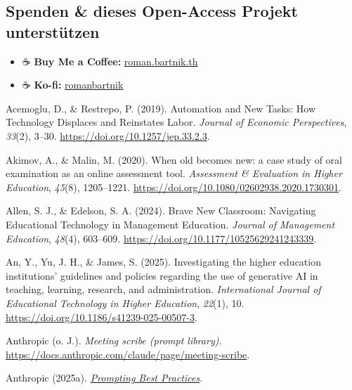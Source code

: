 \documentclass[
  ngerman,
  letterpaper,
  DIV=11]{scrreprt}
\newlength{\cslhangindent}
\newenvironment{CSLReferences}[2] %
 {\begin{list}{}{%
  \setlength{\itemindent}{0pt}
  \setlength{\leftmargin}{0pt}
  \setlength{\parsep}{0pt}
  \ifodd #1
   \setlength{\leftmargin}{\cslhangindent}
   \setlength{\itemindent}{-1\cslhangindent}
  \fi
  \setlength{\itemsep}{#2\baselineskip}}}
 {\end{list}}
\providecommand{\tightlist}{%
  \setlength{\itemsep}{0pt}\setlength{\parskip}{0pt}}
\begin{document}
\subsection{Spenden \& dieses Open-Access Projekt unterstützen}

\begin{itemize}
\tightlist
\item
  ☕ \textbf{Buy Me a Coffee:}
  \href{https://buymeacoffee.com/roman.bartnik.th}{roman.bartnik.th}
\item
  ☕ \textbf{Ko-fi:} \href{https://ko-fi.com/romanbartnik}{romanbartnik}
\end{itemize}

\label{refs}
\begin{CSLReferences}{1}{0}
Acemoglu, D., \& Restrepo, P. (2019). Automation and New Tasks: How
Technology Displaces and Reinstates Labor. \emph{Journal of Economic
Perspectives}, \emph{33}(2), 3--30.
\url{https://doi.org/10.1257/jep.33.2.3}.

Akimov, A., \& Malin, M. (2020). When old becomes new: a case study of
oral examination as an online assessment tool. \emph{Assessment \&
Evaluation in Higher Education}, \emph{45}(8), 1205--1221.
\url{https://doi.org/10.1080/02602938.2020.1730301}.

Allen, S. J., \& Edelson, S. A. (2024). Brave New Classroom: Navigating
Educational Technology in Management Education. \emph{Journal of
Management Education}, \emph{48}(4), 603--609.
\url{https://doi.org/10.1177/10525629241243339}.

An, Y., Yu, J. H., \& James, S. (2025). Investigating the higher
education institutions' guidelines and policies regarding the use of
generative AI in teaching, learning, research, and administration.
\emph{International Journal of Educational Technology in Higher
Education}, \emph{22}(1), 10.
\url{https://doi.org/10.1186/s41239-025-00507-3}.

Anthropic (o. J.). \emph{Meeting scribe (prompt library)}.
\url{https://docs.anthropic.com/claude/page/meeting-scribe}.

Anthropic (2025a).
\emph{\href{https://platform.claude.com/docs/en/build-with-claude/prompt-engineering/claude-4-best-practices}{Prompting
Best Practices}}.


\end{CSLReferences}
\end{document}
